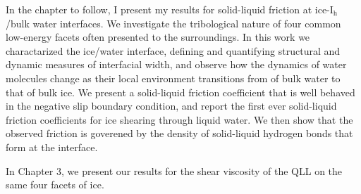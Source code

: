 In the chapter to follow, I present my results for solid-liquid
friction at ice-I$_\mathrm{h}$/bulk water interfaces. We investigate
the tribological nature of four common low-energy facets often
presented to the surroundings. In this work we charactarized the
ice/water interface, defining and quantifying structural and dynamic
measures of interfacial width, and observe how the dynamics of water
molecules change as their local environment transitions from of bulk
water to that of bulk ice. We present a solid-liquid friction
coefficient that is well behaved in the negative slip boundary
condition, and report the first ever solid-liquid friction
coefficients for ice shearing through liquid water. We then show that
the observed friction is goverened by the density of solid-liquid
hydrogen bonds that form at the interface.

In Chapter 3, we present our results for the shear viscosity of the
QLL on the same four facets of ice.
